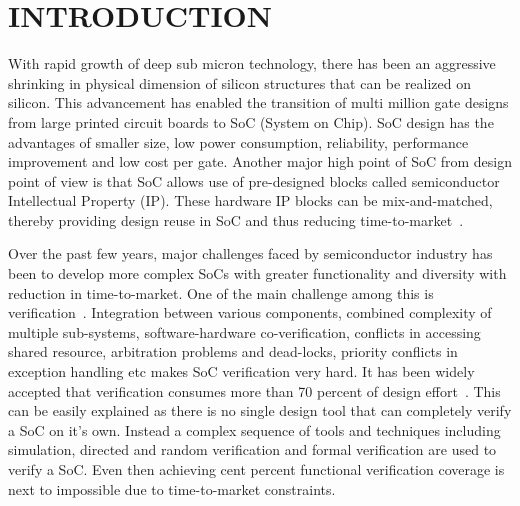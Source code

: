 \chapter{INTRODUCTION}

With rapid growth of deep sub micron technology, there has been an aggressive shrinking in physical dimension of silicon structures that can be realized on silicon. This advancement has enabled the transition of multi million gate designs from large printed circuit boards to SoC (System on Chip). SoC design has the advantages of smaller size, low power consumption, reliability, performance improvement and low cost per gate. Another major high point of SoC from design point of view is that SoC allows use of pre-designed blocks called semiconductor Intellectual Property (IP). These hardware IP blocks can be mix-and-matched, thereby providing design reuse in SoC and thus reducing time-to-market~\citep*{ieee:SOC:2010}. 


 Over the past few years, major challenges faced by semiconductor industry has been to develop more complex SoCs with greater functionality and diversity with reduction in time-to-market. One of the main challenge among this is verification~\citep*{soc}. Integration between various components, combined complexity of multiple sub-systems, software-hardware co-verification, conflicts in accessing shared resource, arbitration problems and dead-locks, priority conflicts in exception handling etc makes SoC verification very hard. It has been widely accepted that verification consumes more than 70 percent of design effort~\citep*{phd:zhang}. This can be easily explained as there is no single design tool that can completely verify a SoC on it's own. Instead a complex sequence of tools and techniques including simulation, directed and random verification and formal verification are used to verify a SoC. Even then achieving cent percent functional verification coverage is next to impossible due to time-to-market constraints.


